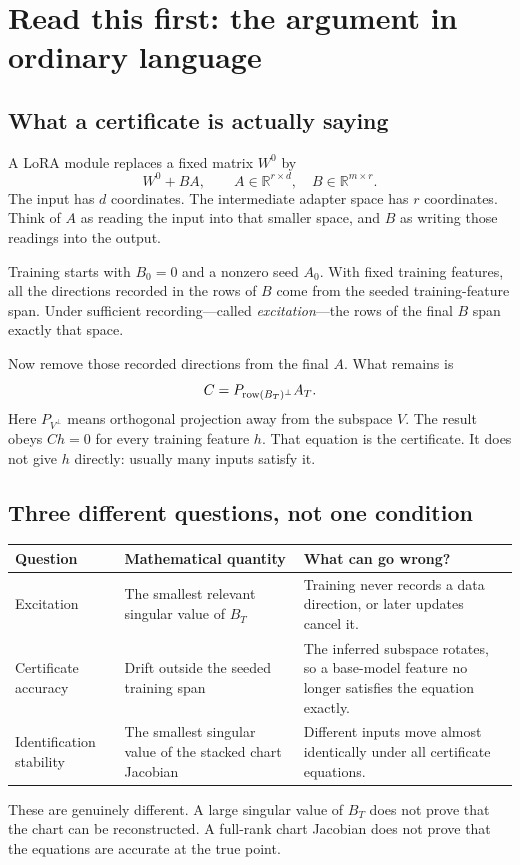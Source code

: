 \documentclass[12pt,a4paper]{article}
\theoremstyle{readable}
\theoremstyle{definition}\newtheorem{example}[theorem]{Example}
\newcommand{\R}{\mathbb R}\newcommand{\rank}{\operatorname{rank}}
\begin{document}
\section{Read this first: the argument in ordinary language}
\label{sec:story}

\subsection{What a certificate is actually saying}
A LoRA module replaces a fixed matrix \(W^0\) by
\[
W^0+BA,\qquad A\in\R^{r\times d},\quad B\in\R^{m\times r}.
\]
The input has \(d\) coordinates. The intermediate adapter space has \(r\) coordinates. Think of \(A\) as reading the input into that smaller space, and \(B\) as writing those readings into the output.

Training starts with \(B_0=0\) and a nonzero seed \(A_0\). With fixed training features, all the directions recorded in the rows of \(B\) come from the seeded training-feature span. Under sufficient recording---called \emph{excitation}---the rows of the final \(B\) span exactly that space.

Now remove those recorded directions from the final \(A\). What remains is
\[
C=P_{\operatorname{row}(B_T)^\perp}A_T.
\]
Here \(P_{V^\perp}\) means orthogonal projection away from the subspace \(V\). The result obeys \(Ch=0\) for every training feature \(h\). That equation is the certificate. It does not give \(h\) directly: usually many inputs satisfy it.

\subsection{Three different questions, not one condition}
\begin{center}
\begin{tabular}{@{}>{\raggedright\arraybackslash}p{31mm}p{56mm}p{60mm}@{}}
\toprule Question & Mathematical quantity & What can go wrong?\\\midrule
Excitation & The smallest relevant singular value of \(B_T\) & Training never records a data direction, or later updates cancel it.\\
Certificate accuracy & Drift outside the seeded training span & The inferred subspace rotates, so a base-model feature no longer satisfies the equation exactly.\\
Identification stability & The smallest singular value of the stacked chart Jacobian & Different inputs move almost identically under all certificate equations.\\\bottomrule
\end{tabular}
\end{center}
These are genuinely different. A large singular value of \(B_T\) does not prove that the chart can be reconstructed. A full-rank chart Jacobian does not prove that the equations are accurate at the true point.
\end{document}
